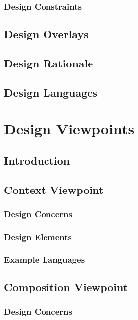\documentclass[letterpaper,10pt,titlepage,draftclsnofoot,onecolumn,onesided] {IEEEtran}
\begin{document}
\subsubsection{Design Constraints}

\subsection{Design Overlays}

\subsection{Design Rationale}

\subsection{Design Languages}

\section{Design Viewpoints}

\subsection{Introduction}

\subsection{Context Viewpoint}
\subsubsection{Design Concerns}
\subsubsection{Design Elements}
\subsubsection{Example Languages}

\subsection{Composition Viewpoint}
\subsubsection{Design Concerns}
\end{document}
